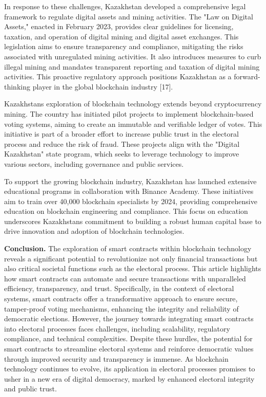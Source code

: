 In response to these challenges, Kazakhstan developed a comprehensive
legal framework to regulate digital assets and mining activities. The
"Law on Digital Assets," enacted in February 2023, provides clear
guidelines for licensing, taxation, and operation of digital mining and
digital asset exchanges. This legislation aims to ensure transparency
and compliance, mitigating the risks associated with unregulated mining
activities. It also introduces measures to curb illegal mining and
mandates transparent reporting and taxation of digital mining
activities. This proactive regulatory approach positions Kazakhstan as a
forward-thinking player in the global blockchain industry\hspace{0pt}
{[}17{]}.

Kazakhstan\textquotesingle s exploration of blockchain technology
extends beyond cryptocurrency mining. The country has initiated pilot
projects to implement blockchain-based voting systems, aiming to create
an immutable and verifiable ledger of votes. This initiative is part of
a broader effort to increase public trust in the electoral process and
reduce the risk of fraud. These projects align with the "Digital
Kazakhstan" state program, which seeks to leverage technology to improve
various sectors, including governance and public services.

To support the growing blockchain industry, Kazakhstan has launched
extensive educational programs in collaboration with Binance Academy.
These initiatives aim to train over 40,000 blockchain specialists by
2024, providing comprehensive education on blockchain engineering and
compliance. This focus on education underscores
Kazakhstan\textquotesingle s commitment to building a robust human
capital base to drive innovation and adoption of blockchain
technologies.

\textbf{Conclusion.} The exploration of smart contracts within
blockchain technology reveals a significant potential to revolutionize
not only financial transactions but also critical societal functions
such as the electoral process. This article highlights how smart
contracts can automate and secure transactions with unparalleled
efficiency, transparency, and trust. Specifically, in the context of
electoral systems, smart contracts offer a transformative approach to
ensure secure, tamper-proof voting mechanisms, enhancing the integrity
and reliability of democratic elections. However, the journey towards
integrating smart contracts into electoral processes faces challenges,
including scalability, regulatory compliance, and technical
complexities. Despite these hurdles, the potential for smart contracts
to streamline electoral systems and reinforce democratic values through
improved security and transparency is immense. As blockchain technology
continues to evolve, its application in electoral processes promises to
usher in a new era of digital democracy, marked by enhanced electoral
integrity and public trust.

